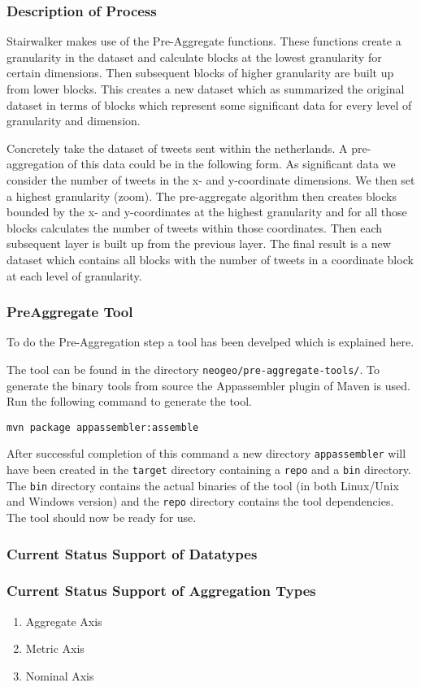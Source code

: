 \subsubsection{Description of Process}
Stairwalker makes use of the Pre-Aggregate functions. These functions create a granularity in the dataset and calculate blocks at the lowest granularity for certain dimensions. Then subsequent blocks of higher granularity are built up from lower blocks. This creates a new dataset which as summarized the original dataset in terms of blocks which represent some significant data for every level of granularity and dimension.

\noindent Concretely take the dataset of tweets sent within the netherlands. A pre-aggregation of this data could be in the following form. As significant data we consider the number of tweets in the x- and y-coordinate dimensions. We then set a highest granularity (zoom). The pre-aggregate algorithm then creates blocks bounded by the x- and y-coordinates at the highest granularity and for all those blocks calculates the number of tweets within those coordinates. Then each subsequent layer is built up from the previous layer. The final result is a new dataset which contains all blocks with the number of tweets in a coordinate block at each level of granularity.

\subsubsection{PreAggregate Tool}
To do the Pre-Aggregation step a tool has been develped which is explained here.

\noindent The tool can be found in the directory \lstinline$neogeo/pre-aggregate-tools/$. To generate the binary tools from source the Appassembler plugin of Maven is used. Run the following command to generate the tool.
\begin{lstlisting}
mvn package appassembler:assemble
\end{lstlisting}
After successful completion of this command a new directory \lstinline$appassembler$ will have been created in the \lstinline$target$ directory containing a \lstinline$repo$ and a \lstinline$bin$ directory. The \lstinline$bin$ directory contains the actual binaries of the tool (in both Linux/Unix and Windows version) and the \lstinline$repo$ directory contains the tool dependencies. The tool should now be ready for use.
\subsubsection{Current Status Support of Datatypes}

\subsubsection{Current Status Support of Aggregation Types}

\begin{enumerate}
	\item Aggregate Axis
	\item Metric Axis
	\item Nominal Axis
\end{enumerate}